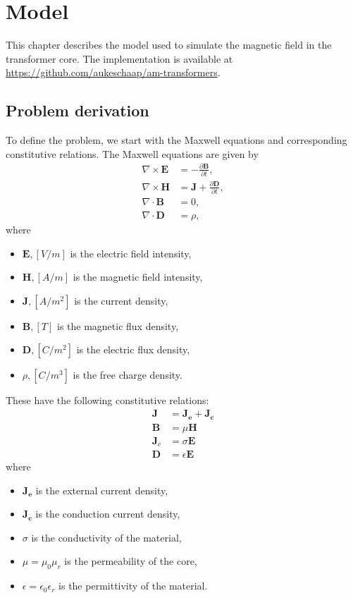 \chapter{Model} \label{sec:model}
This chapter describes the model used to simulate the magnetic field in the transformer core. The implementation is available at \url{https://github.com/aukeschaap/am-transformers}.

\section{Problem derivation}

To define the problem, we start with the Maxwell equations and corresponding constitutive relations. The Maxwell equations are given by
\begin{align*}
    \nabla \times \mathbf{E} &= -\frac{\partial \mathbf{B}}{\partial t}, \\
    \nabla \times \mathbf{H} &=  \mathbf{J} + \frac{\partial \mathbf{D}}{\partial t}, \\
    \nabla \cdot \mathbf{B} &= 0, \\
    \nabla \cdot \mathbf{D} &= \rho,
\end{align*}
where
\begin{itemize}
    \item $\mathbf{E}, [V/m]$ is the electric field intensity,
    \item $\mathbf{H}, [A/m]$ is the magnetic field intensity,
    \item $\mathbf{J}, [A/m^2]$ is the current density,
    \item $\mathbf{B}, [T]$ is the magnetic flux density,
    \item $\mathbf{D}, [C/m^2]$ is the electric flux density,
    \item $\rho, [C/m^3]$ is the free charge density.
\end{itemize}

\noindent These have the following constitutive relations:
\begin{align*}
    \mathbf{J} &= \mathbf{J_e} + \mathbf{J_c} \\
    \mathbf{B} &= \mu\mathbf{H} \\
    \mathbf{J}_c &= \sigma\mathbf E \\
    \mathbf{D} &= \epsilon \mathbf E
\end{align*}
where
\begin{itemize}
    \item $\mathbf{J_e}$ is the external current density,
    \item $\mathbf{J_c}$ is the conduction current density,
    \item $\sigma$ is the conductivity of the material,
    \item $\mu = \mu_0\mu_r$ is the permeability of the core,
    \item $\epsilon = \epsilon_0\epsilon_r$ is the permittivity of the material.
\end{itemize}


